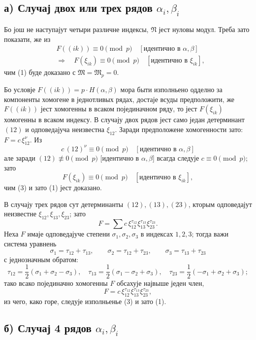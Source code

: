 ﻿\documentclass[11pt]{article}
\providecommand{\frM}{\mathfrak M}
\providecommand{\frN}{\mathfrak N}
\begin{document}
\subsection*{а) Случај двох или трех рядов \(\alpha_i,\beta_i\)}

Бо још не наступајут четыри различне индексы, \(\frN\) јест нуловы модул. Треба зато показати, же из
\begin{equation}
\begin{aligned}
        &F((ik))\equiv0\pmod p\quad [\text{идентично в \(\alpha,\beta\)}]\\
        &\Longrightarrow\quad
        F(\xi_{ik})\equiv0\pmod p\quad [\text{идентично в \(\xi_{ik}\)}],
\end{aligned}
\end{equation}
чим (1) буде доказано с \(\frM=\frM_p=0\).

Бо условје \(F((ik))=p\cdot H(\alpha,\beta)\) мора быти изполньено одделно за компоненты хомогене в једнотливых рядах, достаје всуды предположити, же \(F((ik))\) јест хомогенны в всаком појединачном ряду, то јест \(F(\xi_{ik})\) хомогенны в всаком индексу. В случају двох рядов јест само један детерминант \((12)\) и одповедајуча неизвестна \(\xi_{12}\). Заради предположене хомогенности зато: \(F=c\,\xi_{12}^\nu\). Из
\[
        c\,(12)^\nu\equiv0\pmod p\quad[\text{идентично в \(\alpha,\beta\)}]
\]
але заради \((12)\not\equiv0\pmod p\) [идентично в \(\alpha,\beta\)] всагда следује \(c\equiv0\pmod p\); зато
\[
        F(\xi_{ik})\equiv0\pmod p\quad [\text{идентично в \(\xi_{ik}\)}],
\]
чим (3) и зато (1) јест доказано.

В случају трех рядов сут детерминанты \((12),(13),(23)\), кторым одповедајут неизвестне \(\xi_{12},\xi_{13},\xi_{23}\); зато
\[
        F=\sum c\,\xi_{12}^{\tau_{12}}\xi_{13}^{\tau_{13}}\xi_{23}^{\tau_{23}}.
\]
Неха \(F\) имаје одповедајуче степени \(\sigma_1,\sigma_2,\sigma_3\) в индексах \(1,2,3\); тогда важи система уравнень
\[
        \sigma_1=\tau_{12}+\tau_{13},\qquad
        \sigma_2=\tau_{12}+\tau_{23},\qquad
        \sigma_3=\tau_{13}+\tau_{23}
\]
с једнозначным обратом:
\[
        \tau_{12}=\frac12(\sigma_1+\sigma_2-\sigma_3),\quad
        \tau_{13}=\frac12(\sigma_1-\sigma_2+\sigma_3),\quad
        \tau_{23}=\frac12(-\sigma_1+\sigma_2+\sigma_3);
\]
тако всако појединачно хомогенны \(F\) обсахује највыше једен член,
\[
        F=c\,\xi_{12}^{\tau_{12}}\xi_{13}^{\tau_{13}}\xi_{23}^{\tau_{23}},
\]
из чего, како горе, следује изполньенье (3) и зато (1).

\subsection*{б) Случај 4 рядов \(\alpha_i,\beta_i\)}
\end{document}
